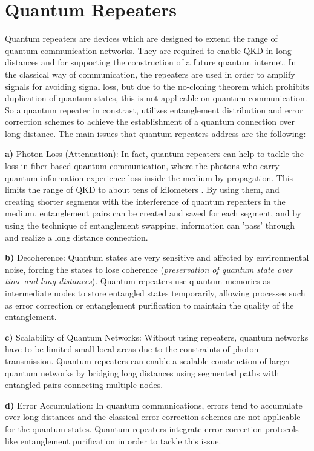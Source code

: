 		\section{Quantum Repeaters}
		
		Quantum repeaters are devices which are designed to extend the range of quantum communication networks. They 
		are required to enable QKD in long distances and for supporting the construction of a future quantum internet.
		In the classical way of communication, the repeaters are used in order to amplify signals 
		for avoiding signal loss, but due to the no-cloning theorem which prohibits duplication of quantum states,
		this is not applicable on quantum communication. So a quantum repeater in constrast, utilizes entanglement distribution 
		and error correction schemes to achieve the establishment of a quantum connection over long distance.
		The main issues that quantum repeaters address are the following:

		\textbf{a)} Photon Loss (Attenuation):
		In fact, quantum repeaters can help to tackle the loss in fiber-based quantum communication,
		where the photons who carry quantum information experience loss inside the medium by propagation. 
		This limits the range of QKD to about tens of kilometers \cite{repeater1}. 
		By using them, and creating shorter segments with the interference of quantum repeaters in the medium,
		entanglement pairs can be created and saved for each segment, 
		and by using the technique of entanglement swapping, information can 'pass' through and realize a long distance connection.

		\textbf{b)} Decoherence:
		Quantum states are very sensitive and affected by environmental noise, forcing the states to lose coherence (\textit{preservation of quantum
		state over time and long distances}).
		Quantum repeaters use quantum memories\cite{memories} as intermediate nodes to store entangled states 
		temporarily, allowing processes such as error correction or entanglement purification to maintain 
		the quality of the entanglement.
		
		\textbf{c)} Scalability of Quantum Networks:
		Without using repeaters, quantum networks have to be limited small local areas due to the
		constraints of photon transmission.
		Quantum repeaters can enable a scalable construction 
		of larger quantum networks by bridging long distances using segmented 
		paths with entangled pairs connecting multiple nodes.
		
		\textbf{d)} Error Accumulation:
		In quantum communications, errors tend to accumulate over long distances
		and the classical error correction schemes are not applicable for the quantum states.
		Quantum repeaters integrate error correction protocols like entanglement purification
		in order to tackle this issue.

